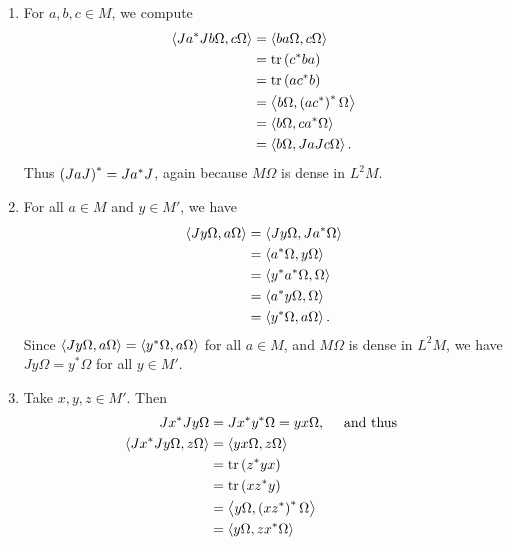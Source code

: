 \documentclass[a4paper,10pt]{report}
\begin{document}
\begin{enumerate}
\begin{enumerate}
	        \item For $a , b , c \in M$, we compute
                  \begin{align*}
                    \ET J a^* J b \Omega , c \Omega \TE%
                    &= \ET b a \Omega , c \Omega \TE\\
                    &= \tr \E c^* b a \R\\
                    &= \tr \E a c^* b \R\\
                    &= \ET b \Omega , \E a c^* \R^* \Omega \TE\\
                    &= \ET b \Omega , c a^* \Omega \TE\\
                    &= \ET b \Omega , J a J c \Omega \TE.
                  \end{align*}
                  Thus $\left( J a J \right)^* = J a^* J$, again because $M \Omega$ is dense in $L^2 M$.
		\item For all $a \in M$ and $y \in M'$, we have
                  \begin{align*}
                    \ET J y \Omega , a \Omega \TE%
                    &= \ET J y \Omega , J a^* \Omega \TE\\
                    &= \ET a^* \Omega , y \Omega \TE\\
                    &= \ET y^* a^* \Omega , \Omega \TE\\
                    &= \ET a^* y \Omega , \Omega \TE\\
                    &= \ET y^* \Omega , a \Omega \TE.
                  \end{align*}
                  Since $\left\langle J y \Omega , a \Omega \right\rangle = \left\langle y^* \Omega , a \Omega \right\rangle$ for all $a \in M$, and $M \Omega$ is dense in $L^2 M$, we have $J y \Omega = y^* \Omega$ for all $y \in M'$.
		\item Take $x , y , z \in M'$.  Then
                  \begin{align*}
                    J x^* J y \Omega%
                    &= J x^* y^* \Omega = y x \Omega, \quad \text{ and thus }\\
                    \ET J x^* J y \Omega , z \Omega \TE%
                    &= \ET y x \Omega , z \Omega \TE\\
                    &= \tr \E z^* y x \R\\
                    &= \tr \E x z^* y \R \\
                    &= \ET y \Omega , \E x z^* \R^* \Omega \TE\\
                    &= \ET y \Omega , z x^* \Omega \TE\\

\end{align*}
\end{enumerate}
\end{enumerate}
\end{document}
